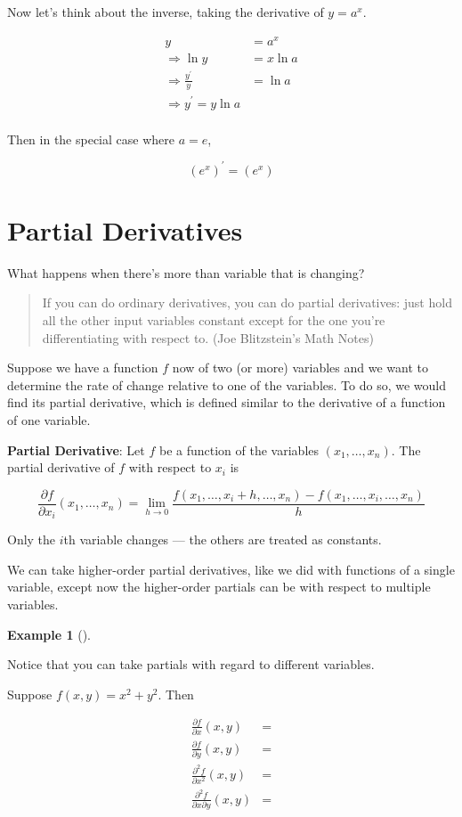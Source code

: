 \documentclass[
  letterpaper,
]{book}
\theoremstyle{definition}
\theoremstyle{definition}
\newtheorem{example}{Example}[chapter]
\theoremstyle{plain}
\theoremstyle{definition}
\theoremstyle{plain}
\theoremstyle{plain}
\theoremstyle{remark}
\begin{document}
Now let's think about the inverse, taking the derivative of \(y = a^x\).

\begin{align*}
y &= a^x \\
\Rightarrow \ln y &= x \ln a\\
\Rightarrow \frac{y^\prime}{y} &= \ln a\\
\Rightarrow  y^\prime = y \ln a\\
\end{align*}

Then in the special case where \(a = e\),

\[(e^x)^\prime = (e^x)\]

\hypertarget{partial-derivatives}{%
\section{Partial Derivatives}\label{partial-derivatives}}

What happens when there's more than variable that is changing?

\begin{quote}
If you can do ordinary derivatives, you can do partial derivatives: just
hold all the other input variables constant except for the one you're
differentiating with respect to. (Joe Blitzstein's Math Notes)
\end{quote}

Suppose we have a function \(f\) now of two (or more) variables and we
want to determine the rate of change relative to one of the variables.
To do so, we would find its partial derivative, which is defined similar
to the derivative of a function of one variable.

\textbf{Partial Derivative}: Let \(f\) be a function of the variables
\((x_1,\ldots,x_n)\). The partial derivative of \(f\) with respect to
\(x_i\) is

\[\frac{\partial f}{\partial x_i} (x_1,\ldots,x_n) = \lim\limits_{h\to 0} \frac{f(x_1,\ldots,x_i+h,\ldots,x_n)-f(x_1,\ldots,x_i,\ldots,x_n)}{h}\]

Only the \(i\)th variable changes --- the others are treated as
constants.

We can take higher-order partial derivatives, like we did with functions
of a single variable, except now the higher-order partials can be with
respect to multiple variables.

\leavevmode{}%
\begin{example}[]\label{exm-}

Notice that you can take partials with regard to different variables.

Suppose \(f(x,y)=x^2+y^2\). Then

\begin{align*}
\frac{\partial f}{\partial x}(x,y) &=\\
\frac{\partial f}{\partial y}(x,y) &=\\
\frac{\partial^2 f}{\partial x^2}(x,y) &=\\
\frac{\partial^2 f}{\partial x \partial y}(x,y) &=
\end{align*}

\end{example}
\end{document}
